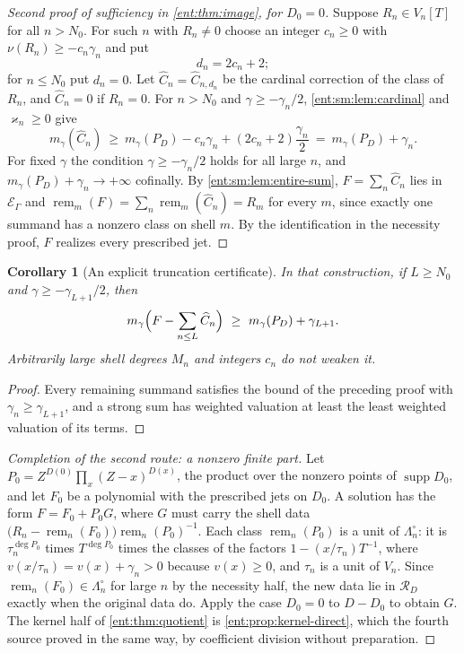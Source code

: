 \documentclass[11pt]{article}
\theoremstyle{plain}
\theoremstyle{plain}
\theoremstyle{plain}
\newtheorem{corollary}[corollary]{Corollary}
\theoremstyle{definition}
\theoremstyle{definition}
\theoremstyle{definition}
\theoremstyle{definition}
\theoremstyle{remark}
\newcommand{\E}{\mathcal E_\Gamma}
\DeclareMathOperator{\supp}{supp}\DeclareMathOperator{\lc}{lc}
\DeclareMathOperator{\remp}{rem}\DeclareMathOperator{\Res}{Res}
\newcommand{\RD}{\mathcal R_D}\newcommand{\Ucal}{\mathcal U}
\begin{document}
\begin{proof}[Second proof of sufficiency in \cref{ent:thm:image}, for $D_0=0$]
Suppose $R_n\in V_n[T]$ for all $n>N_0$. For such $n$ with $R_n\ne0$ choose an
integer $c_n\ge0$ with $\nu(R_n)\ge-c_n\gamma_n$ and put
\begin{equation}\label{ent:sm:eq:d-choice}
 d_n=2c_n+2;
\end{equation}
for $n\le N_0$ put $d_n=0$. Let $\widehat C_n=\widehat C_{n,d_n}$ be the
cardinal correction of the class of $R_n$, and $\widehat C_n=0$ if $R_n=0$.
For $n>N_0$ and $\gamma\ge-\gamma_n/2$, \cref{ent:sm:lem:cardinal} and
$\varkappa_n\ge0$ give
\[
 m_\gamma(\widehat C_n)\ \ge\ m_\gamma(P_D)-c_n\gamma_n
   +(2c_n+2)\frac{\gamma_n}{2}
 \ =\ m_\gamma(P_D)+\gamma_n .
\]
For fixed $\gamma$ the condition $\gamma\ge-\gamma_n/2$ holds for all large
$n$, and $m_\gamma(P_D)+\gamma_n\to+\infty$ cofinally. By
\cref{ent:sm:lem:entire-sum}, $F=\sum_n\widehat C_n$ lies in $\E$ and
$\remp_m(F)=\sum_n\remp_m(\widehat C_n)=R_m$ for every $m$, since exactly one
summand has a nonzero class on shell $m$. By the identification in the
necessity proof, $F$ realizes every prescribed jet.
\end{proof}

\begin{corollary}[An explicit truncation certificate]\label{ent:sm:cor:error}
In that construction, if $L\ge N_0$ and $\gamma\ge-\gamma_{L+1}/2$, then
\[
 m_\gamma\Bigl(F-\sum_{n\le L}\widehat C_n\Bigr)\ \ge\
 m_\gamma(P_D)+\gamma_{L+1}.
\]
Arbitrarily large shell degrees $M_n$ and integers $c_n$ do not weaken it.
\end{corollary}
\begin{proof}
Every remaining summand satisfies the bound of the preceding proof with
$\gamma_n\ge\gamma_{L+1}$, and a strong sum has weighted valuation at least
the least weighted valuation of its terms.
\end{proof}

\begin{proof}[Completion of the second route: a nonzero finite part]
Let $P_0=Z^{D(0)}\prod_x(Z-x)^{D(x)}$, the product over the nonzero points of
$\supp D_0$, and let $F_0$ be a polynomial with the prescribed jets on $D_0$.
A solution has the form $F=F_0+P_0G$, where $G$ must carry the shell data
$\bigl(R_n-\remp_n(F_0)\bigr)\remp_n(P_0)^{-1}$. Each class $\remp_n(P_0)$ is
a unit of $\Lambda_n^\circ$: it is $\tau_n^{\deg P_0}$ times $T^{\deg P_0}$
times the classes of the factors $1-(x/\tau_n)T^{-1}$, where
$v(x/\tau_n)=v(x)+\gamma_n>0$ because $v(x)\ge0$, and $\tau_n$ is a unit of
$V_n$. Since $\remp_n(F_0)\in\Lambda_n^\circ$ for large $n$ by the necessity
half, the new data lie in $\RD$ exactly when the original data do. Apply the
case $D_0=0$ to $D-D_0$ to obtain $G$. The kernel half of
\cref{ent:thm:quotient} is \cref{ent:prop:kernel-direct}, which the fourth
source proved in the same way, by coefficient division without preparation.
\end{proof}
\end{document}
